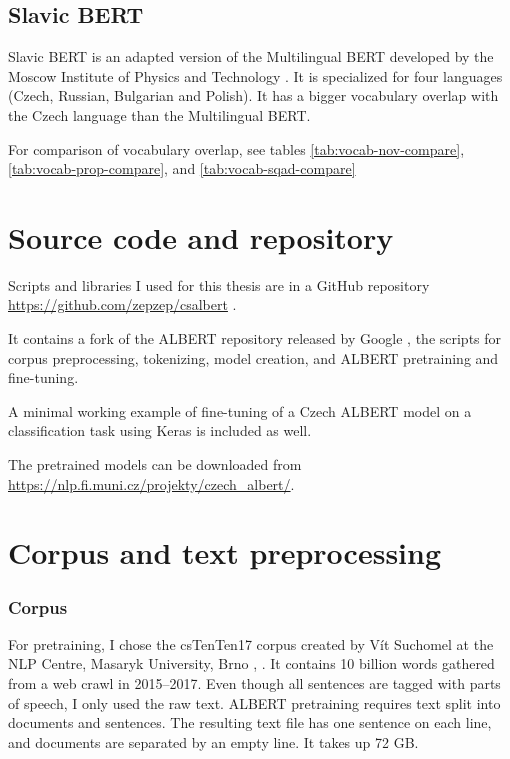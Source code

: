 \documentclass[
  printed, %
  color,   %
  table,   %
  oneside, %
  lof,     %
  lot,     %
]{fithesis3}
\begin{document}
\subsection{Slavic BERT}
Slavic BERT is an adapted version of the Multilingual BERT developed by the Moscow Institute of Physics and Technology \parencite{slavicbert}. It is specialized for four languages (Czech, Russian, Bulgarian and Polish). It has a bigger vocabulary overlap with the Czech language than the Multilingual BERT.

\vspace{1em}

{\parindent=0cm
For comparison of vocabulary overlap, see tables \ref{tab:vocab-nov-compare}, \ref{tab:vocab-prop-compare}, and \ref{tab:vocab-sqad-compare}
}


\section{Source code and repository}
Scripts and libraries I used for this thesis are in a GitHub repository \url{https://github.com/zepzep/csalbert} \parencite{thesis_repo}.

It contains a fork of the ALBERT repository released by Google \parencite{albert_repo}, the scripts for corpus preprocessing, tokenizing, model creation, and ALBERT pretraining and fine-tuning.

A minimal working example of fine-tuning of a Czech ALBERT model on a classification task using Keras is included as well.

The pretrained models can be downloaded from \url{https://nlp.fi.muni.cz/projekty/czech_albert/}.


\section{Corpus and text preprocessing}
\subsubsection{Corpus}
For pretraining, I chose the csTenTen17 corpus created by Vít Suchomel at the NLP Centre, Masaryk University, Brno \parencite{tenten1}, \parencite{tenten2}. It contains 10 billion words gathered from a web crawl in 2015--2017.  Even though all sentences are tagged with parts of speech, I only used the raw text. ALBERT pretraining requires text split into documents and sentences. The resulting text file has one sentence on each line, and documents are separated by an empty line. It takes up 72 GB. 
\end{document}
